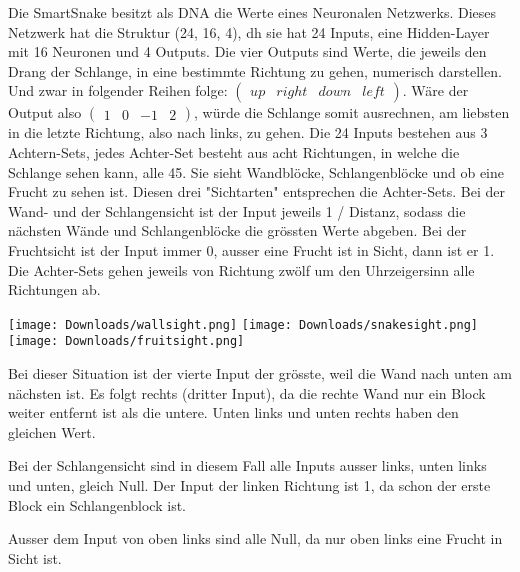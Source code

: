 \documentclass[10pt,a4paper,ngerman,english]{article}
\begin{document}
Die SmartSnake besitzt als DNA die Werte eines Neuronalen Netzwerks. Dieses Netzwerk hat die Struktur (24, 16, 4), dh sie hat 24 Inputs, eine Hidden-Layer mit 16 Neuronen und 4 Outputs. Die vier Outputs sind Werte, die jeweils den Drang der Schlange, in eine bestimmte Richtung zu gehen, numerisch darstellen. Und zwar in folgender Reihen folge: $ \left(\begin{array}{cccc} up & right & down & left\end{array}\right) $. Wäre der Output also $ \left(\begin{array}{cccc} 1 & 0 & -1 & 2\end{array}\right) $, würde die Schlange somit ausrechnen, am liebsten in die letzte Richtung, also nach links, zu gehen. Die 24 Inputs bestehen aus 3 Achtern-Sets, jedes Achter-Set besteht aus acht Richtungen, in welche die Schlange sehen kann, alle 45\degree. Sie sieht Wandblöcke, Schlangenblöcke und ob eine Frucht zu sehen ist. Diesen drei "Sichtarten" entsprechen die Achter-Sets. Bei der Wand- und der Schlangensicht ist der Input jeweils 1 / Distanz, sodass die nächsten Wände und Schlangenblöcke die grössten Werte abgeben. Bei der Fruchtsicht ist der Input immer 0, ausser eine Frucht ist in Sicht, dann ist er 1. Die Achter-Sets gehen jeweils von Richtung zwölf um den Uhrzeigersinn alle Richtungen ab.

\begin{center}
\texttt{[image: Downloads/wallsight.png]}
\texttt{[image: Downloads/snakesight.png]}
\texttt{[image: Downloads/fruitsight.png]}
\end{center}
\begin{multicols}{3}
    Bei dieser Situation ist der vierte Input der grösste, weil die Wand nach unten am nächsten ist. Es folgt rechts (dritter Input), da die rechte Wand nur ein Block weiter entfernt ist als die untere. Unten links und unten rechts haben den gleichen Wert.
    
    \columnbreak
    
    Bei der Schlangensicht sind in diesem Fall alle Inputs ausser links, unten links und unten, gleich Null. Der Input der linken Richtung ist 1, da schon der erste Block ein Schlangenblock ist.

    \columnbreak

    Ausser dem Input von oben links sind alle Null, da nur oben links eine Frucht in Sicht ist. 

\end{multicols}
\end{document}
